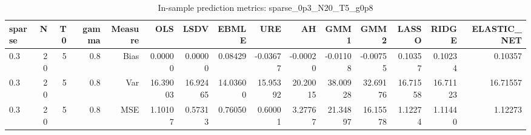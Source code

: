 \begin{table}[!htbp]\centering
\caption{In-sample prediction metrics: sparse_0p3_N20_T5_g0p8}
\label{tab:table2_sparse_0p3_N20_T5_g0p8}
\begin{tabular}{lrrrrrrrrrrrrrr}
\hline
sparse & N & T0 & gamma & Measure & OLS & LSDV & EBMLE & URE & AH & GMM1 & GMM2 & LASSO & RIDGE & ELASTIC_NET \\
\hline
0.3 & 20 & 5 & 0.8 & Bias & 0.00000 & 0.00000 & 0.08429 & -0.03677 & -0.00020 & -0.01108 & -0.00755 & 0.10357 & 0.10234 & 0.10357 \\
0.3 & 20 & 5 & 0.8 & Var & 16.39003 & 16.92465 & 14.03600 & 15.95392 & 20.20015 & 38.00928 & 32.69176 & 16.71558 & 16.71123 & 16.71557 \\
0.3 & 20 & 5 & 0.8 & MSE & 1.10107 & 0.57313 & 0.76050 & 0.60001 & 3.27767 & 21.34897 & 16.15578 & 1.12274 & 1.11440 & 1.12273 \\
\hline
\end{tabular}
\end{table}


